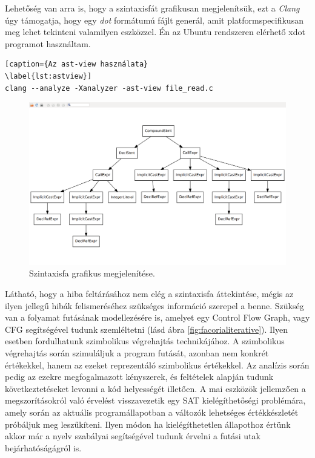 \documentclass[a4paper,12pt]{report}
\begin{document}
Lehetőség van arra is, hogy a szintaxisfát grafikusan megjelenítsük, ezt a \emph{Clang} úgy támogatja, hogy egy \emph{dot} formátumú fájlt generál, amit platformspecifikusan meg lehet tekinteni valamilyen eszközzel. Én az Ubuntu rendszeren elérhető xdot programot használtam.
\begin{lstlisting}[caption={Az ast-view használata}
\label{lst:astview}]
clang --analyze -Xanalyzer -ast-view file_read.c
\end{lstlisting}

\begin{figure}[h]
\caption{Szintaxisfa grafikus megjelenítése.}
\centering
\includegraphics[scale=0.2]{astview.png}
\end{figure}

Látható, hogy a hiba feltárásához nem elég a szintaxisfa áttekintése, mégis az ilyen jellegű hibák felismeréséhez szükséges információ szerepel a benne. Szükség van a folyamat futásának modellezésére is, amelyet egy Control Flow Graph, vagy CFG segítségével tudunk szemléltetni (lásd ábra \ref{fig:facorialiterative}). Ilyen esetben fordulhatunk szimbolikus végrehajtás technikájához. A szimbolikus végrehajtás során szimuláljuk a program futását, azonban nem konkrét értékekkel, hanem az ezeket reprezentáló szimbolikus értékekkel. Az analízis során pedig az ezekre megfogalmazott kényszerek, és feltételek alapján tudunk következtetéseket levonni a kód helyességét illetően. A mai eszközök jellemzően a megszorításokról való érvelést visszavezetik egy SAT kielégíthetőségi problémára, amely során az aktuális programállapotban a változók lehetséges értékkészletét próbáljuk meg leszűkíteni. Ilyen módon ha kielégíthetetlen állapothoz értünk akkor már a nyelv szabályai segítségével tudunk érvelni a futási utak bejárhatóságágról is.
\end{document}
